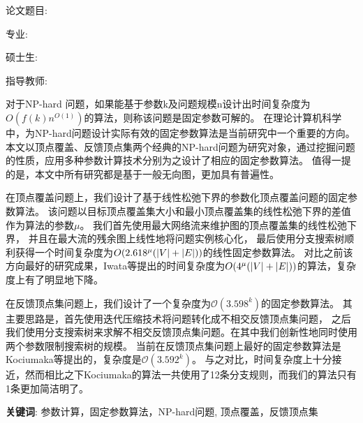 ﻿

\setcounter{page}{1}
\renewcommand{\thepage}{\Roman{page}}
\setlength{\parindent}{0em}
论文题目: \,\ctitle

专\hspace{2em}业: \,\major

硕\hspace{0.5em}士\hspace{0.5em}生: \,\cauthor

指导教师: \,\supervisor
\setlength{\parindent}{2em}

\vspace{1.2cm}
 \centerline{}
\vspace{0.3cm}
对于NP-hard 问题，如果能基于参数k及问题规模n设计出时间复杂度为$O(f(k)n^{O(1)})$的算法，则称该问题是固定参数可解的。
在理论计算机科学中，为NP-hard问题设计实际有效的固定参数算法是当前研究中一个重要的方向。
本文以顶点覆盖、反馈顶点集两个经典的NP-hard问题为研究对象，通过挖掘问题的性质，应用多种参数计算技术分别为之设计了相应的固定参数算法。
值得一提的是，本文中所有研究都是基于一般无向图，更加具有普遍性。

在顶点覆盖问题上，我们设计了基于线性松弛下界的参数化顶点覆盖问题的固定参数算法。
该问题以目标顶点覆盖集大小和最小顶点覆盖集的线性松弛下界的差值作为算法的参数$\mu$。
我们首先使用最大网络流来维护图的顶点覆盖集的线性松弛下界，
并且在最大流的残余图上线性地将问题实例核心化，
最后使用分支搜索树顺利获得一个时间复杂度为$O(2.618^\mu(\left\vert V \right\vert + \left\vert E \right\vert))$的线性固定参数算法。
对比之前该方向最好的研究成果，Iwata等提出的时间复杂度为$O(4^\mu(\left\vert V \right\vert + \left\vert E \right\vert))$的算法，复杂度上有了明显地下降。

在反馈顶点集问题上，我们设计了一个复杂度为$\mathcal{O}(3.598^k)$的固定参数算法。
其主要思路是，首先使用迭代压缩技术将问题转化成不相交反馈顶点集问题，
之后我们使用分支搜索树来求解不相交反馈顶点集问题。在其中我们创新性地同时使用两个参数限制搜索树的规模。
当前在反馈顶点集问题上最好的固定参数算法是Kociumaka等提出的，复杂度是$\mathcal{O}(3.592^k)$。
与之对比，时间复杂度上十分接近，然而相比之下Kociumaka的算法一共使用了12条分支规则，而我们的算法只有1条更加简洁明了。

\vspace{1cm}

{\noindent\hei \textbf{关键词}}: {参数计算，固定参数算法，NP-hard问题, 顶点覆盖，反馈顶点集}

